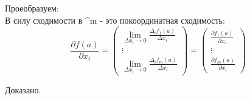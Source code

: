 Проеобразуем: \\
В силу сходимости в  ^{m} - это покоординатная сходимость: \\
\[\frac{\partial f(a)}{\partial x_{i}}=\left(\begin{array}{c}
\lim _{\Delta x_{i} \rightarrow 0} \frac{\Delta_{i} f_{1}(a)}{\Delta x_{i}} \\
\vdots \\
\lim _{\Delta x_{i} \rightarrow 0} \frac{\Delta_{i} f_{m}(a)}{\Delta x_{i}}
\end{array}\right)=\left(\begin{array}{c}
\frac{\partial f_{1}(a)}{\partial x_{i}} \\
\vdots \\
\frac{\partial f_{m}(a)}{\partial x_{i}}
\end{array}\right)\]

Доказано.
